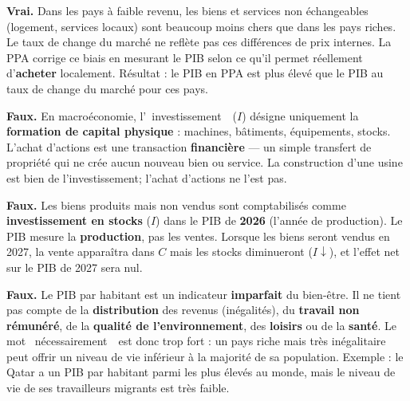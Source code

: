 
\begin{reponse}
\textbf{Vrai.} Dans les pays à faible revenu, les biens et services non échangeables (logement, services locaux) sont beaucoup moins chers que dans les pays riches. Le taux de change du marché ne reflète pas ces différences de prix internes. La PPA corrige ce biais en mesurant le PIB selon ce qu'il permet réellement d'\textbf{acheter} localement. Résultat : le PIB en PPA est plus élevé que le PIB au taux de change du marché pour ces pays.
\end{reponse}


\begin{reponse}
\textbf{Faux.} En macroéconomie, l'\guillemotleft~investissement~\guillemotright\ ($I$) désigne uniquement la \textbf{formation de capital physique} : machines, bâtiments, équipements, stocks. L'achat d'actions est une transaction \textbf{financière} --- un simple transfert de propriété qui ne crée aucun nouveau bien ou service. La construction d'une usine est bien de l'investissement; l'achat d'actions ne l'est pas.
\end{reponse}


\begin{reponse}
\textbf{Faux.} Les biens produits mais non vendus sont comptabilisés comme \textbf{investissement en stocks} ($I$) dans le PIB de \textbf{2026} (l'année de production). Le PIB mesure la \textbf{production}, pas les ventes. Lorsque les biens seront vendus en 2027, la vente apparaîtra dans $C$ mais les stocks diminueront ($I\downarrow$), et l'effet net sur le PIB de 2027 sera nul.
\end{reponse}


\begin{reponse}
\textbf{Faux.} Le PIB par habitant est un indicateur \textbf{imparfait} du bien-être. Il ne tient pas compte de la \textbf{distribution} des revenus (inégalités), du \textbf{travail non rémunéré}, de la \textbf{qualité de l'environnement}, des \textbf{loisirs} ou de la \textbf{santé}. Le mot \guillemotleft~nécessairement~\guillemotright\ est donc trop fort : un pays riche mais très inégalitaire peut offrir un niveau de vie inférieur à la majorité de sa population. Exemple : le Qatar a un PIB par habitant parmi les plus élevés au monde, mais le niveau de vie de ses travailleurs migrants est très faible.
\end{reponse}

